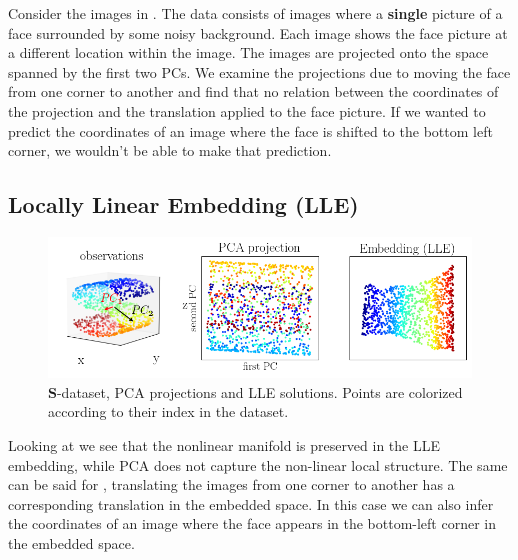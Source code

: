Consider the images in . The data consists of images where a \textbf{single} picture of a face surrounded by some noisy background. Each image shows the face picture at a different location within the image. The images are projected onto the space spanned by the first two PCs. We examine the projections due to moving the face from one corner to another and find that no relation between the coordinates of the projection and the translation applied to the face picture. If we wanted to predict the coordinates of an image where the face is shifted to the bottom left corner, we wouldn't be able to make that prediction.

\newpage

\begin{frame}
\section{Locally Linear Embedding (LLE)}

\begin{figure}[ht]
	\centering
    \includegraphics[width=12cm]{img/s_data_proj.png}
	\caption{$\textbf{S}$-dataset, PCA projections and LLE solutions. Points are colorized according to their index in the dataset.}
	\label{fig:s_data_proj_lle}
\end{figure}


\end{frame}

Looking at  we see that the nonlinear manifold is preserved in the LLE embedding, while PCA does not capture the non-linear local structure. The same can be said for , translating the images from one corner to another has a corresponding translation in the embedded space. In this case we can also infer the coordinates of an image where the face appears in the bottom-left corner in the embedded space.

